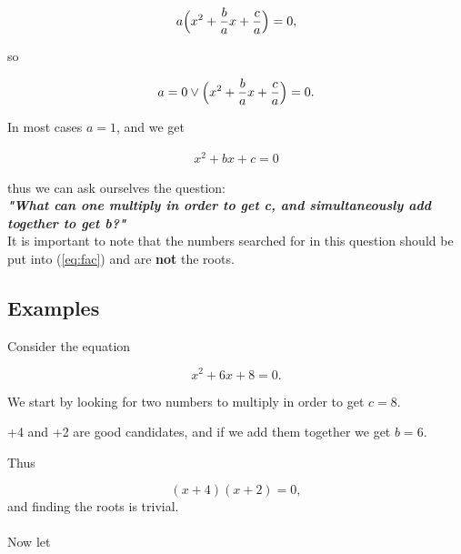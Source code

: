 \documentclass[a4paper]{article}
\begin{document}
	\begin{align}
		a\Bigl( x^2 + \frac{b}{a}x + \frac{c}{a} \Bigr) = 0,
	\end{align}

so

	\begin{align} \label{eq:factor}
  		a = 0 \vee \Bigl( x^2 + \frac{b}{a}x + \frac{c}{a} \Bigr) = 0.
	\end{align}	

In most cases $a=1$, and we get

	\begin{align}
		x^2 + bx + c = 0
	\end{align}

thus we can ask ourselves the question:\\ \newline \emph{\textbf{"What can one multiply in order to get c, and simultaneously add together to get b?"}}\\

It is important to note that the numbers searched for in this question should be put into (\ref{eq:fac}) and are \textbf{not} the roots.




\newpage

\vspace*{-30mm}

\subsection{Examples}
Consider the equation

\begin{equation}  \label{eq:ex1}
	x^2 + 6x + 8 = 0.
\end{equation}

We start by looking for two numbers to multiply in order to get $c=8$.

+4 and +2 are good candidates, and if we add them together we get $b=6$.

Thus

\begin{equation} \label{eq:ex11}
 (x+4)(x+2) = 0,
\end{equation}
and finding the roots is trivial.\\ \\
Now let
\end{document}
